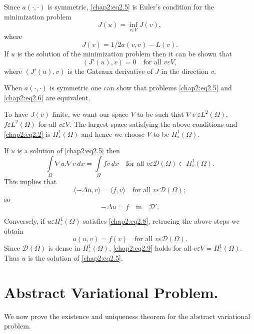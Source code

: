 Since $a(\cdotp,\cdotp)$ is symmetric, \eqref{chap2:eq2.5} is Euler's condition for
the minimization problem 
\begin{equation}\label{chap2:eq2.6}
J(u)=\inf\limits_{v\varepsilon V} J(v),
\end{equation}
where
$$
J(v)=1/2 a(v, v)-L(v).
$$
If $u$ is the solution of the minimization problem then it can be
shown that 
\begin{equation}\label{chap2:eq2.7}
(J'(u),v)=0 \quad \text{for all }  v\varepsilon V,
\end{equation}
where $(J'(u),v)$ is the Gateaux derivative of $J$ in the direction
$v$.

When $a(\cdotp,\cdotp)$ is symmetric one can show that problems
\eqref{chap2:eq2.5} and \eqref{chap2:eq2.6} are equivalent.

To have $J(v)$ finite, we want our space $V$ to be such that $\nabla
v \;\varepsilon L^2(\Omega)$, $f \varepsilon L^2(\Omega)$ for all
$v\varepsilon V$. The largest space satisfying the above conditions
and \eqref{chap2:eq2.2} is $H_\circ^1(\Omega)$ and hence we choose $V$ to be
$H_\circ^1(\Omega)$. 

If $u$ is a solution of \eqref{chap2:eq2.5} then
$$
\int\limits_\Omega\nabla u.\nabla v \,dx=\int\limits_\Omega f v\,
dx\quad \text{for all } v \varepsilon \mathscr{D}(\Omega)\subset
H_\circ^1(\Omega).
$$\pageoriginale
This implies that 
$$
\langle -\Delta u, v \rangle = \langle f, v\rangle \quad \text{for all }
v\varepsilon\mathscr{D}(\Omega);
$$
so
\begin{equation}\label{chap2:eq2.8}
-\Delta u = f \quad \text{in} \quad \mathscr{D}'.
\end{equation}

Conversely, if $u\varepsilon H_\circ^1(\Omega)$ satisfies
\eqref{chap2:eq2.8}, retracing the above steps we obtain 
\begin{equation}\label{chap2:eq2.9}
a(u, v)=f(v) \quad \text{for all } v\varepsilon\mathscr{D}(\Omega).
\end{equation}
Since $\mathscr{D}(\Omega)$ is dense in $H_\circ^1(\Omega)$,
\eqref{chap2:eq2.9} holds for all $v\varepsilon
V=H_\circ^1(\Omega)$. Thus $u$ is the solution of \eqref{chap2:eq2.5}.

\section{Abstract Variational Problem.}\label{chap2:ssec2.2}
We now prove the existence and uniqueness theorem for the abstract
variational problem.


